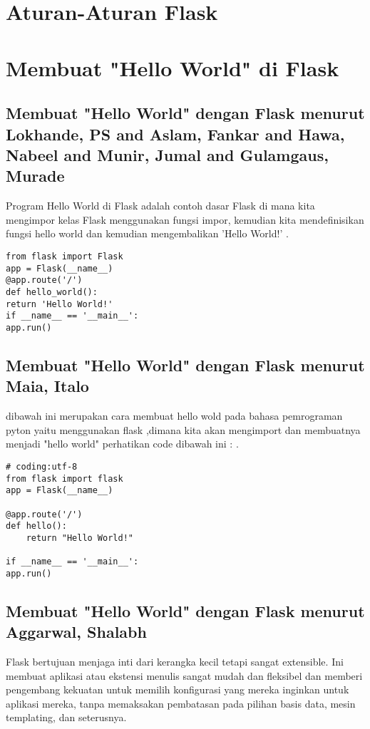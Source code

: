 \documentclass[12pt]{article}
\begin{document}
\section{Aturan-Aturan Flask}

 
 
\section{Membuat "Hello World" di Flask}
\subsection{Membuat "Hello World" dengan Flask menurut Lokhande, PS and Aslam, Fankar and Hawa, Nabeel and Munir, Jumal and Gulamgaus, Murade}
Program Hello World di Flask adalah contoh dasar Flask di mana kita mengimpor kelas Flask menggunakan fungsi impor, kemudian kita mendefinisikan fungsi hello world dan kemudian mengembalikan 'Hello World!' \cite{lokhande2015efficient}.
\begin{verbatim}
from flask import Flask
app = Flask(__name__)
@app.route('/')
def hello_world():
return 'Hello World!'
if __name__ == '__main__':
app.run()
\end{verbatim}

\subsection{Membuat "Hello World" dengan Flask menurut Maia, Italo}
dibawah ini merupakan cara membuat hello wold pada bahasa pemrograman pyton yaitu menggunakan flask ,dimana kita akan mengimport dan membuatnya menjadi "hello world" perhatikan code dibawah ini :
\cite{maia2015building}.
\begin{verbatim}
# coding:utf-8
from flask import flask 
app = Flask(__name__)

@app.route('/')
def hello():
	return "Hello World!"
	
if __name__ == '__main__':
app.run()
\end{verbatim}

\subsection{Membuat "Hello World" dengan Flask menurut Aggarwal, Shalabh }
Flask bertujuan menjaga inti dari kerangka kecil tetapi sangat extensible. Ini membuat aplikasi atau ekstensi menulis sangat mudah dan fleksibel dan memberi pengembang kekuatan untuk memilih konfigurasi yang mereka inginkan untuk aplikasi mereka, tanpa memaksakan pembatasan pada pilihan basis data, mesin templating, dan seterusnya\cite{aggarwal2014flask}.
\end{document}

